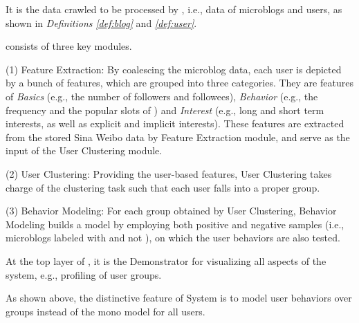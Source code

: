  It is the data crawled to be processed by \sys{}, i.e., data of microblogs and users, as shown in \textit{Definitions} \textit{\ref{def:blog}} and \textit{\ref{def:user}}.

\sys{} consists of three key modules.

	\stab(1)  Feature Extraction: By coalescing the microblog data, each user is depicted by a bunch of features, which are grouped into three categories. They are features of \textit{Basics} (e.g., the number of followers and followees), \textit{Behavior} (e.g., the frequency and the popular slots of \retg{}) and \textit{Interest} (e.g., long and short term interests, as well as explicit and implicit interests). These features are extracted from the stored  Sina Weibo data by Feature Extraction module, and serve as the input of the User Clustering module.
	
	\stab(2)  User Clustering: Providing the user-based features, User Clustering takes charge of the clustering task such that each user falls into a proper group.
	
	\stab(3)  Behavior Modeling: For each group obtained by User Clustering, Behavior Modeling builds a  model by employing both positive and negative samples (i.e., microblogs labeled with \retd{} and not \retd{}), on which the user \retg{} behaviors are also tested.
	
 At the top layer of \sys{}, it is the Demonstrator for visualizing all aspects of the system, e.g., profiling of user groups.


As shown above, the distinctive feature of System  \sys{} is to model user \retg{} behaviors over groups instead of the mono model for all users.

